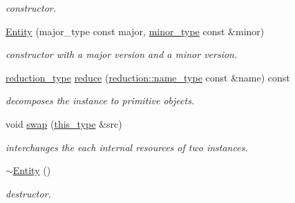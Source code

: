 \begin{DoxyCompactItemize}
\begin{DoxyCompactList}\small\item\em constructor. \end{DoxyCompactList}\item 
\hypertarget{classhryky_1_1ip_1_1vf_1_1_entity_ad22df4cf7eeb486d3310bafee2b3598c}{\hyperlink{classhryky_1_1ip_1_1vf_1_1_entity_ad22df4cf7eeb486d3310bafee2b3598c}{Entity} (major\-\_\-type const major, \hyperlink{classhryky_1_1_vector}{minor\-\_\-type} const \&minor)}\label{classhryky_1_1ip_1_1vf_1_1_entity_ad22df4cf7eeb486d3310bafee2b3598c}

\begin{DoxyCompactList}\small\item\em constructor with a major version and a minor version. \end{DoxyCompactList}\item 
\hypertarget{classhryky_1_1ip_1_1vf_1_1_entity_a0925baf1b795c13d7da75a5917f12205}{\hyperlink{namespacehryky_a343a9a4c36a586be5c2693156200eadc}{reduction\-\_\-type} \hyperlink{classhryky_1_1ip_1_1vf_1_1_entity_a0925baf1b795c13d7da75a5917f12205}{reduce} (\hyperlink{namespacehryky_1_1reduction_ac686c30a4c8d196bbd0f05629a6b921f}{reduction\-::name\-\_\-type} const \&name) const }\label{classhryky_1_1ip_1_1vf_1_1_entity_a0925baf1b795c13d7da75a5917f12205}

\begin{DoxyCompactList}\small\item\em decomposes the instance to primitive objects. \end{DoxyCompactList}\item 
\hypertarget{classhryky_1_1ip_1_1vf_1_1_entity_a54fb00eac1464d94bc1d4e94576747f4}{void \hyperlink{classhryky_1_1ip_1_1vf_1_1_entity_a54fb00eac1464d94bc1d4e94576747f4}{swap} (\hyperlink{classhryky_1_1ip_1_1vf_1_1_entity_adf2e2de606d79343c1f1a1aa016d9abd}{this\-\_\-type} \&src)}\label{classhryky_1_1ip_1_1vf_1_1_entity_a54fb00eac1464d94bc1d4e94576747f4}

\begin{DoxyCompactList}\small\item\em interchanges the each internal resources of two instances. \end{DoxyCompactList}\item 
\hypertarget{classhryky_1_1ip_1_1vf_1_1_entity_aa79cac1977059edd8db10758456ef9d9}{\hyperlink{classhryky_1_1ip_1_1vf_1_1_entity_aa79cac1977059edd8db10758456ef9d9}{$\sim$\-Entity} ()}\label{classhryky_1_1ip_1_1vf_1_1_entity_aa79cac1977059edd8db10758456ef9d9}

\begin{DoxyCompactList}\small\item\em destructor. \end{DoxyCompactList}\end{DoxyCompactItemize}

